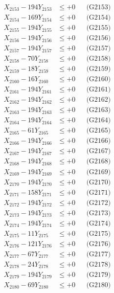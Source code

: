 \documentclass[a4paper,10pt]{article}
\begin{document}
{\begin{align}
X_{2153} - 194Y_{2153} &\leq +0 && \text{(G2153)} \\
X_{2154} - 169Y_{2154} &\leq +0 && \text{(G2154)} \\
X_{2155} - 194Y_{2155} &\leq +0 && \text{(G2155)} \\
X_{2156} - 194Y_{2156} &\leq +0 && \text{(G2156)} \\
X_{2157} - 194Y_{2157} &\leq +0 && \text{(G2157)} \\
X_{2158} - 70Y_{2158} &\leq +0 && \text{(G2158)} \\
X_{2159} - 18Y_{2159} &\leq +0 && \text{(G2159)} \\
X_{2160} - 16Y_{2160} &\leq +0 && \text{(G2160)} \\
\allowbreak
X_{2161} - 194Y_{2161} &\leq +0 && \text{(G2161)} \\
X_{2162} - 194Y_{2162} &\leq +0 && \text{(G2162)} \\
X_{2163} - 194Y_{2163} &\leq +0 && \text{(G2163)} \\
X_{2164} - 194Y_{2164} &\leq +0 && \text{(G2164)} \\
X_{2165} - 61Y_{2165} &\leq +0 && \text{(G2165)} \\
X_{2166} - 194Y_{2166} &\leq +0 && \text{(G2166)} \\
X_{2167} - 194Y_{2167} &\leq +0 && \text{(G2167)} \\
X_{2168} - 194Y_{2168} &\leq +0 && \text{(G2168)} \\
X_{2169} - 194Y_{2169} &\leq +0 && \text{(G2169)} \\
X_{2170} - 194Y_{2170} &\leq +0 && \text{(G2170)} \\
\allowbreak
X_{2171} - 158Y_{2171} &\leq +0 && \text{(G2171)} \\
X_{2172} - 194Y_{2172} &\leq +0 && \text{(G2172)} \\
X_{2173} - 194Y_{2173} &\leq +0 && \text{(G2173)} \\
X_{2174} - 194Y_{2174} &\leq +0 && \text{(G2174)} \\
X_{2175} - 11Y_{2175} &\leq +0 && \text{(G2175)} \\
X_{2176} - 121Y_{2176} &\leq +0 && \text{(G2176)} \\
X_{2177} - 67Y_{2177} &\leq +0 && \text{(G2177)} \\
X_{2178} - 24Y_{2178} &\leq +0 && \text{(G2178)} \\
X_{2179} - 194Y_{2179} &\leq +0 && \text{(G2179)} \\
X_{2180} - 69Y_{2180} &\leq +0 && \text{(G2180)} \\

\end{align}}
\end{document}
